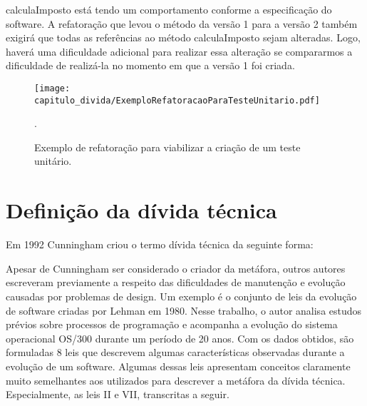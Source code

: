 calculaImposto está tendo um comportamento conforme a especificação do software. A refatoração que levou o método da versão 1 para a versão 2 também exigirá que todas as referências ao método calculaImposto sejam alteradas. Logo, haverá uma dificuldade adicional para realizar essa alteração se compararmos a dificuldade de realizá-la no momento em que a versão 1 foi criada. 
 
 
  \begin{figure}[H]
  \centering
  \texttt{[image: capitulo\_divida/ExemploRefatoracaoParaTesteUnitario.pdf]} 
  \caption{Exemplo de refatoração para viabilizar a criação de um teste unitário. }.
  \label{fig:cap1_exemplo_refatoracao_teste_unitario} 
\end{figure}








\section{Definição da dívida técnica}
\label{definicao_divida_tecnica}

Em 1992 Cunningham\cite{cunningham1993wycash} criou o termo dívida técnica da seguinte forma:
 



Apesar de Cunningham ser considerado o criador da metáfora, outros autores escreveram previamente a respeito das dificuldades de manutenção e evolução causadas por problemas de design. Um exemplo é o conjunto de leis da evolução de software criadas por Lehman \cite{lehman1980programs,lehman1996laws} em 1980. Nesse trabalho, o autor analisa estudos prévios sobre processos de programação e acompanha a evolução  do  sistema operacional OS/300 durante um período de 20 anos. Com os dados obtidos, são formuladas 8 leis que descrevem algumas características observadas durante a evolução de um software. Algumas dessas leis apresentam conceitos claramente muito semelhantes aos utilizados para descrever a metáfora da dívida técnica. Especialmente, as leis II e VII, transcritas a seguir.

